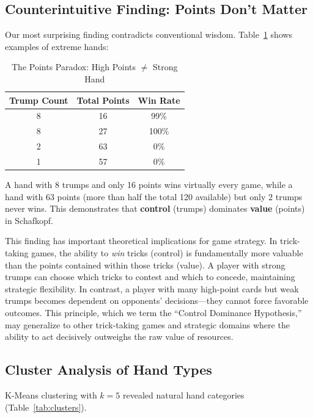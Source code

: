 \documentclass[conference]{IEEEtran}
\begin{document}
\subsection{Counterintuitive Finding: Points Don't Matter}

Our most surprising finding contradicts conventional wisdom. Table~\ref{tab:points_paradox} shows examples of extreme hands:

\begin{table}[htbp]
\caption{The Points Paradox: High Points $\neq$ Strong Hand}
\begin{center}
\begin{tabular}{ccc}
\toprule
\textbf{Trump Count} & \textbf{Total Points} & \textbf{Win Rate} \\
\midrule
8 & 16 & 99\% \\
8 & 27 & 100\% \\
2 & 63 & 0\% \\
1 & 57 & 0\% \\
\bottomrule
\end{tabular}
\label{tab:points_paradox}
\end{center}
\end{table}

A hand with 8 trumps and only 16 points wins virtually every game, while a hand with 63 points (more than half the total 120 available) but only 2 trumps never wins. This demonstrates that \textbf{control} (trumps) dominates \textbf{value} (points) in Schafkopf.

This finding has important theoretical implications for game strategy. In trick-taking games, the ability to \textit{win} tricks (control) is fundamentally more valuable than the points contained within those tricks (value). A player with strong trumps can choose which tricks to contest and which to concede, maintaining strategic flexibility. In contrast, a player with many high-point cards but weak trumps becomes dependent on opponents' decisions---they cannot force favorable outcomes. This principle, which we term the ``Control Dominance Hypothesis,'' may generalize to other trick-taking games and strategic domains where the ability to act decisively outweighs the raw value of resources.

\subsection{Cluster Analysis of Hand Types}

K-Means clustering with $k=5$ revealed natural hand categories (Table~\ref{tab:clusters}).
\end{document}
